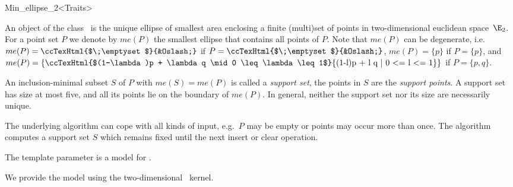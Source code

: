
\begin{ccRefClass}{Min_ellipse_2<Traits>}


\ccSaveThreeColumns
\cgalMinEllipseLayout

\ccDefinition

An object of the class \ccRefName\ is the unique ellipse of smallest area
enclosing a finite (multi)set of points in two-dimensional euclidean
space~$\E_2$.  For a point set $P$ we denote by $me(P)$ the smallest
ellipse that contains all points of $P$. Note that $me(P)$ can be
degenerate,
i.e.~$me(P)=\mbox{\ccTexHtml{$\;\emptyset$}{&Oslash;}}$ if
$P=\mbox{\ccTexHtml{$\;\emptyset$}{&Oslash;}}$, $me(P)=\{p\}$ if $P=\{p\}$,
and $me(P) = \{ \mbox{\ccTexHtml{$(1-\lambda)p + \lambda q \mid 0 \leq
    \lambda \leq 1$}{(1-l)p + l q | 0 <= l <= 1}} \}$ if $P=\{p,q\}$.

An inclusion-minimal subset $S$ of $P$ with $me(S)=me(P)$ is called a
\emph{support set},
the points in $S$ are the \emph{support points}.  A support set has size at
most five, and all its points lie on the boundary of $me(P)$. In general,
neither the support set nor its size are necessarily unique.

The underlying algorithm can cope with all kinds of input, e.g.~$P$ may be
empty or points may occur more than once. The algorithm computes a support
set $S$ which remains fixed until the next insert or clear operation.


\ccRequirements
\ccIndexRequirements

The template parameter  is a model for .

We provide the model  using the 
two-dimensional \cgal~kernel.

\ccTypes
\ccIndexClassTypes


\end{ccRefClass}
